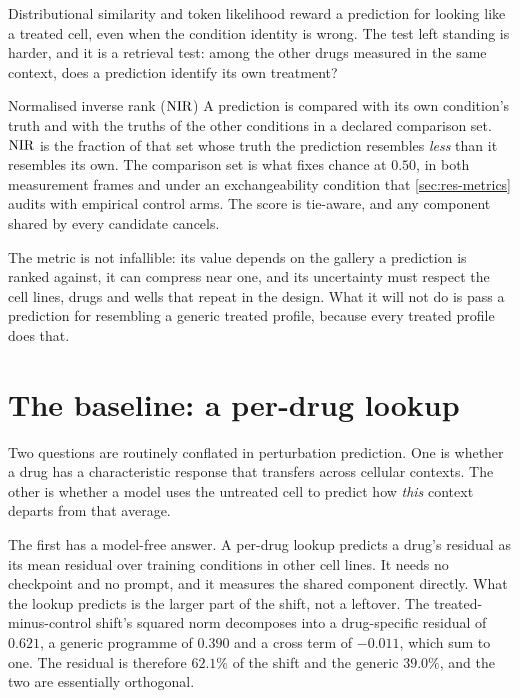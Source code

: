 Distributional similarity and token likelihood reward a prediction for looking
like a treated cell, even when the condition identity is wrong. The test left
standing is harder, and it is a retrieval test: among the other drugs measured
in the same context, does a prediction identify its own treatment?

\begin{defn}{Normalised inverse rank ($\textrm{NIR}$)}
A prediction is compared with its own condition's truth and with the truths of
the other conditions in a declared comparison set. $\textrm{NIR}$ is the fraction of that
set whose truth the prediction resembles \emph{less} than it resembles its own.
The comparison set is what fixes chance at $0.50$, in both measurement frames and
under an exchangeability condition that \cref{sec:res-metrics} audits with
empirical control arms. The score is tie-aware, and any component shared by every
candidate cancels.
\end{defn}

The metric is not infallible: its value depends on the gallery a prediction is
ranked against, it can compress near one, and its uncertainty must respect the
cell lines, drugs and wells that repeat in the design. What it will not do is
pass a prediction for resembling a generic treated profile, because every
treated profile does that.

\section{The baseline: a per-drug lookup}
\label{sec:intro-bar}

Two questions are routinely conflated in perturbation prediction. One is whether
a drug has a characteristic response that transfers across cellular contexts.
The other is whether a model uses the untreated cell to predict how \emph{this}
context departs from that average.

The first has a model-free answer. A per-drug lookup predicts a
drug's residual as its mean residual over training conditions in other cell
lines. It needs no checkpoint and no prompt, and it measures the shared
component directly. What the lookup predicts is the larger part of the shift, not a leftover. The
treated-minus-control shift's squared norm decomposes into a drug-specific
residual of $0.621$, a generic programme of $0.390$ and a cross term of
$-0.011$, which sum to one. The residual is therefore $62.1\%$ of the shift and
the generic $39.0\%$, and the two are essentially orthogonal.

